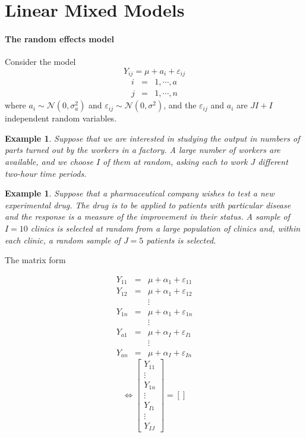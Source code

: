 \documentclass{article}
\newtheorem{example}[theorem]{Example}
\begin{document}
\section{Linear Mixed Models}

\paragraph{The random effects model}

Consider the model%
\begin{equation*}
Y_{ij}=\mu +a_{i}+\varepsilon _{ij}
\end{equation*}%
\begin{eqnarray*}
i &=&1,\cdots ,a \\
j &=&1,\cdots ,n
\end{eqnarray*}%
where $a_{i}\sim \mathcal{N}\left( 0,\sigma _{a}^{2}\right) $ and $%
\varepsilon _{ij}\sim \mathcal{N}\left( 0,\sigma ^{2}\right) $, and the $%
\varepsilon _{ij}$ and $a_{i}$ are $JI+I$ independent random variables.

\begin{example}
Suppose that we are interested in studying the output in numbers of parts
turned out by the workers in a factory. A large number of workers are
available, and we choose $I$ of them at random, asking each to work $J$
different two-hour time periods.
\end{example}

\begin{example}
Suppose that a pharmaceutical company wishes to test a new experimental
drug. The drug is to be applied to patients with particular disease and the
response is a measure of the improvement in their status. A sample of $I=10$
clinics is selected at random from a large population of clinics and, within
each clinic, a random sample of $J=5$ patients is selected.
\end{example}

\bigskip 

The matrix form

\begin{eqnarray*}
Y_{11} &=&\mu +\alpha _{1}+\varepsilon _{11} \\
Y_{12} &=&\mu +\alpha _{1}+\varepsilon _{12} \\
&&\vdots  \\
Y_{1n} &=&\mu +\alpha _{1}+\varepsilon _{1n} \\
&&\vdots  \\
Y_{a1} &=&\mu +\alpha _{I}+\varepsilon _{I1} \\
&&\vdots  \\
Y_{an} &=&\mu +\alpha _{I}+\varepsilon _{In}
\end{eqnarray*}%
\begin{equation*}
\Leftrightarrow \left[ 
\begin{array}{c}
Y_{11} \\ 
\vdots  \\ 
Y_{1n} \\ 
\vdots  \\ 
Y_{I1} \\ 
\vdots  \\ 
Y_{IJ}%
\end{array}%
\right] =\left[ {}\right] 
\end{equation*}
\end{document}

